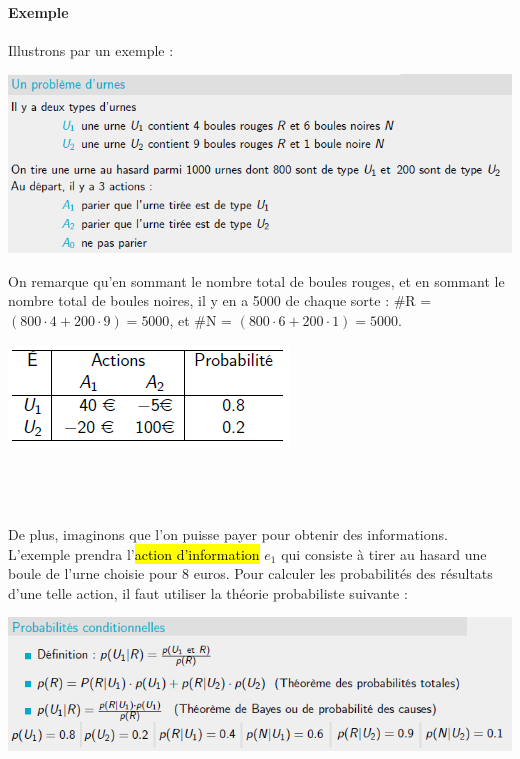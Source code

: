 \documentclass[a4paper, 12pt]{article}
\begin{document}
		\paragraph{Exemple} Illustrons par un exemple :
			\begin{center}
				\includegraphics[width=6in]{Images/urnes}
			\end{center}
			\begin{minipage}{0.6\textwidth}
				On remarque qu'en sommant le nombre total de boules rouges, et en sommant le nombre total de boules noires, il y en
					a 5000 de chaque sorte : \#R = $(800 \cdot 4 + 200 \cdot 9) = 5000$, et \#N = $(800 \cdot 6 + 200 \cdot 1) = 5000$.
			\end{minipage}\hfill
			\begin{minipage}{0.33\textwidth}
				\includegraphics[width=\textwidth]{Images/urnes3}
			\end{minipage}~\\~\\~\\
			De plus, imaginons que l'on puisse payer pour obtenir des informations. L'exemple prendra l'\hl{action d'information} 
				$e_1$ qui consiste à tirer au hasard une boule de l'urne choisie pour 8 euros. Pour calculer les probabilités des 
				résultats d'une telle action, il faut utiliser la théorie probabiliste suivante :
			\begin{center}
				\includegraphics[width=6in]{Images/proba}
			\end{center}
\end{document}

